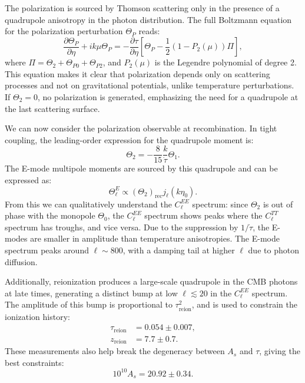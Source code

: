 \documentclass{aa}
\numberwithin{equation}{section}
\numberwithin{table}{section}
\numberwithin{figure}{section}
\begin{document}
The polarization is sourced by Thomson scattering only in the presence of a quadrupole anisotropy in the photon distribution. The full Boltzmann equation for the polarization perturbation $\Theta_P$ reads:
\begin{equation}
\frac{\partial \Theta_P}{\partial \eta} + ik\mu \Theta_P = -\frac{\partial \tau}{\partial \eta} \left[\Theta_P - \frac{1}{2}(1 - P_2(\mu)) \Pi\right],
\end{equation}
where $\Pi = \Theta_2 + \Theta_{P0} + \Theta_{P2}$, and $P_2(\mu)$ is the Legendre polynomial of degree 2. This equation makes it clear that polarization depends only on scattering processes and not on gravitational potentials, unlike temperature perturbations. If $\Theta_2 = 0$, no polarization is generated, emphasizing the need for a quadrupole at the last scattering surface.


We can now consider the polarization observable at recombination. In tight coupling, the leading-order expression for the quadrupole moment is:
\begin{equation}
\Theta_2 = -\frac{8}{15} \frac{k}{\dot{\tau}} \Theta_1.
\end{equation}
The E-mode multipole moments are sourced by this quadrupole and can be expressed as:
\begin{equation}
\Theta_\ell^E \propto (\Theta_2)_{\text{rec}} j_\ell(k\eta_0).
\end{equation}
From this we can qualitatively understand the $C_\ell^{EE}$ spectrum: since $\Theta_2$ is out of phase with the monopole $\Theta_0$, the $C_\ell^{EE}$ spectrum shows peaks where the $C_\ell^{TT}$ spectrum has troughs, and vice versa. Due to the suppression by $1/\dot{\tau}$, the E-modes are smaller in amplitude than temperature anisotropies. The E-mode spectrum peaks around $\ell \sim 800$, with a damping tail at higher $\ell$ due to photon diffusion.

Additionally, reionization produces a large-scale quadrupole in the CMB photons at late times, generating a distinct bump at low $\ell \lesssim 20$ in the $C_\ell^{EE}$ spectrum. The amplitude of this bump is proportional to $\tau_{\text{reion}}^2$, and is used to constrain the ionization history:
\begin{align}
\tau_{\text{reion}} &= 0.054 \pm 0.007, \\
z_{\text{reion}} &= 7.7 \pm 0.7.
\end{align}
These measurements also help break the degeneracy between $A_s$ and $\tau$, giving the best constraints:
\begin{equation}
10^{10} A_s = 20.92 \pm 0.34.
\end{equation}
\end{document}
